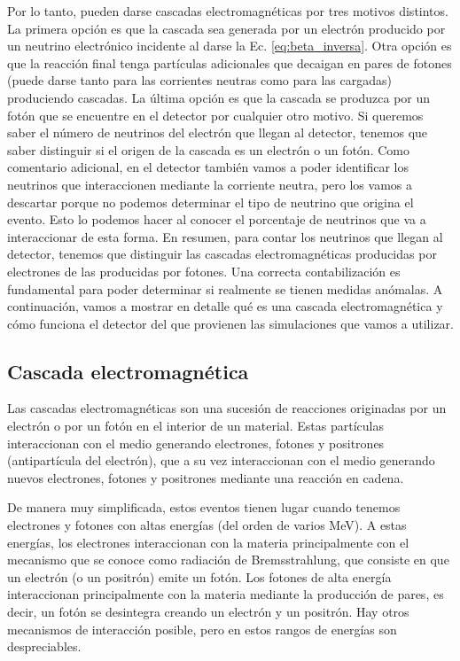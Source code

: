 \documentclass[a4paper,12pt,oneside,titlepage]{book}
\begin{document}
Por lo tanto, pueden darse cascadas electromagnéticas por tres motivos distintos. La primera opción es que la cascada sea generada por un electrón producido por un neutrino electrónico incidente al darse la Ec. \ref{eq:beta_inversa}. Otra opción es que la reacción final tenga partículas adicionales que decaigan en pares de fotones (puede darse tanto para las corrientes neutras como para las cargadas) produciendo cascadas. La última opción es que la cascada se produzca por un fotón que se encuentre en el detector por cualquier otro motivo. Si queremos saber el número de neutrinos del electrón que llegan al detector, tenemos que saber distinguir si el origen de la cascada es un electrón o un fotón. Como comentario adicional, en el detector también vamos a poder identificar los neutrinos que interaccionen mediante la corriente neutra, pero los vamos a descartar porque no podemos determinar el tipo de neutrino que origina el evento. Esto lo podemos hacer al conocer el porcentaje de neutrinos que va a interaccionar de esta forma. En resumen, para contar los neutrinos que llegan al detector, tenemos que distinguir las cascadas electromagnéticas producidas por electrones de las producidas por fotones. Una correcta contabilización es fundamental para poder determinar si realmente se tienen medidas anómalas. A continuación, vamos a mostrar en detalle qué es una cascada electromagnética y cómo funciona el detector del que provienen las simulaciones que vamos a utilizar.

\subsection{Cascada electromagnética}

Las cascadas electromagnéticas son una sucesión de reacciones originadas por un electrón o por un fotón en el interior de un material. Estas partículas interaccionan con el medio generando electrones, fotones y positrones (antipartícula del electrón), que a su vez interaccionan con el medio generando nuevos electrones, fotones y positrones mediante una reacción en cadena.

De manera muy simplificada, estos eventos tienen lugar cuando tenemos electrones y fotones con altas energías (del orden de varios MeV). A estas energías, los electrones interaccionan con la materia principalmente con el mecanismo que se conoce como radiación de Bremsstrahlung, que consiste en que un electrón (o un positrón) emite un fotón.
Los fotones de alta energía interaccionan principalmente con la materia mediante la producción de pares, es decir, un fotón se desintegra creando un electrón y un positrón. Hay otros mecanismos de interacción posible, pero en estos rangos de energías son despreciables.
\end{document}
